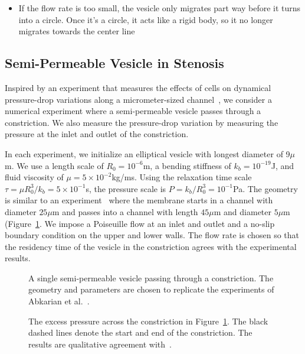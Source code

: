 \documentclass[9pt,twocolumn,twoside,lineno]{pnas-new}
\newif\ifTikz
\begin{document}
\begin{itemize}
  \item If the flow rate is too small, the vesicle only migrates part
    way before it turns into a circle. Once it's a circle, it acts like
    a rigid body, so it no longer migrates towards the center line
\end{itemize}

\subsection*{Semi-Permeable Vesicle in Stenosis}
Inspired by an experiment that measures the effects of cells on 
dynamical pressure-drop variations along a micrometer-sized
channel~\cite{abk-fai-sto2006}, we consider a numerical experiment where
a semi-permeable vesicle passes through a constriction. We also measure
the pressure-drop variation by measuring the pressure at the inlet and
outlet of the constriction. 

In each experiment, we initialize an elliptical vesicle with longest
diameter of 9$\mu$m. We use a length scale of $R_0 = 10^{-6}$m, a
bending stiffness of $k_b = 10^{-19}$J, and fluid viscosity of $\mu=5
\times 10^{-2}$kg/ms. Using the relaxation time scale $\tau = \mu
R_0^3/k_b = 5 \times 10^{-1}$s, the pressure scale is $P = k_b/R_0^3 =
10^{-1}$Pa. The geometry is similar to an
experiment~\cite{abk-fai-sto2006} where the membrane starts in a channel
with diameter $25\mu$m and passes into a channel with length $45\mu$m
and diameter $5\mu$m (Figure~\ref{fig:stenosisGeom}. We impose a
Poiseuille flow at an inlet and outlet and a no-slip boundary condition
on the upper and lower walls. The flow rate is chosen so that the
residency time of the vesicle in the constriction agrees with the
experimental results.

\begin{figure}[htp]
  \ifTikz
  
  \fi
  \caption{\label{fig:stenosisGeom} A single semi-permeable vesicle
  passing through a constriction. The geometry and parameters are chosen
  to replicate the experiments of Abkarian et
  al.~\cite{abk-fai-sto2006}.}
\end{figure}

\begin{figure}[htp]
  \ifTikz
  
  \fi
  \caption{\label{fig:stenosisPressure} The excess pressure across the
  constriction in Figure~\ref{fig:stenosisGeom}. The black dashed lines
  denote the start and end of the constriction. The results are
  qualitative agreement with~\cite{abk-fai-sto2006}.}
\end{figure}
\end{document}
